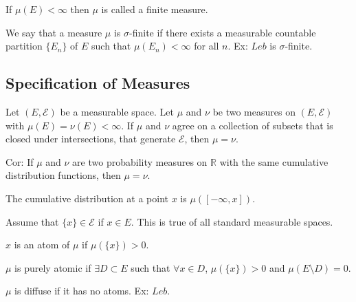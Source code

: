 \documentclass[english, course]{Notes}
\begin{document}
\begin{definition}
	If $\mu(E) < \infty$ then $\mu$ is called a finite measure.
\end{definition}

\begin{definition}
	We say that a measure $\mu$ is $\sigma$-finite if there exists a measurable countable partition $\{E_n\}$ of $E$ such that $\mu(E_n) < \infty$ for all $n$. Ex: $Leb$ is $\sigma$-finite.
\end{definition}

\subsection{Specification of Measures}

 
\begin{theorem}
	Let $(E, \mathcal{E})$ be a measurable space. Let $\mu$ and $\nu$ be two measures on $(E, \mathcal{E})$ with $\mu(E) = \nu(E) < \infty$. If $\mu$ and $\nu$ agree on a collection of subsets that is closed under intersections, that generate $\mathcal{E}$, then $\mu = \nu$.
\end{theorem}

\begin{corollary}
	Cor: If $\mu$ and $\nu$ are two probability measures on $\mathbb{R}$ with the same cumulative distribution functions, then $\mu = \nu$.
\end{corollary}

\begin{definition}
	The cumulative distribution at a point $x$ is $\mu([-\infty, x])$.
\end{definition}

Assume that $\{x\} \in \mathcal{E}$ if $x \in E$. This is true of all standard measurable spaces.\\

\begin{definition}
	$x$ is an atom of $\mu$ if $\mu(\{x\}) > 0$.
\end{definition}

\begin{definition}
	$\mu$ is purely atomic if $\exists D \subset E$ such that $\forall x \in D$, $\mu(\{x\}) > 0$ and $\mu(E \setminus D) = 0$.
\end{definition}

\begin{definition}
	$\mu$ is diffuse if it has no atoms. Ex: $Leb$.
\end{definition}
\end{document}
